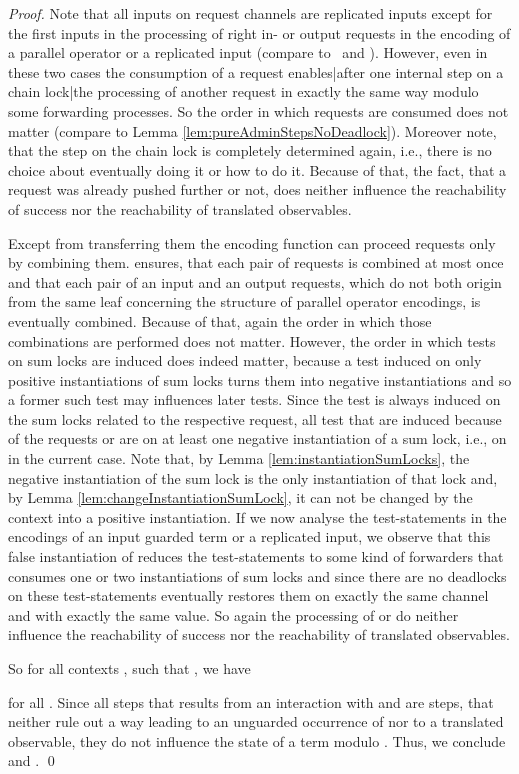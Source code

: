 \documentclass[]{llncs}
\begin{document}
\begin{proof}
	Note that all inputs on request channels are replicated inputs except for the first inputs in the processing of right in- or output requests in the encoding of a parallel operator or a replicated input (compare to \processRightOutputRequests \ and \processRightInputRequests). However, even in these two cases the consumption of a request enables|after one internal step on a chain lock|the processing of another request in exactly the same way modulo some forwarding processes. So the order in which requests are consumed does not matter (compare to Lemma \ref{lem:pureAdminStepsNoDeadlock}). Moreover note, that the step on the chain lock is completely determined again, i.e., there is no choice about eventually doing it or how to do it. Because of that, the fact, that a request was already pushed further or not, does neither influence the reachability of success nor the reachability of translated observables.
	
	Except from transferring them the encoding function can proceed requests only by combining them.  ensures, that each pair of requests is combined at most once and that each pair of an input and an output requests, which do not both origin from the same leaf concerning the structure of parallel operator encodings, is eventually combined. Because of that, again the order in which those combinations are performed does not matter. However, the order in which tests on sum locks are induced does indeed matter, because a test induced on only positive instantiations of sum locks turns them into negative instantiations and so a former such test may influences later tests. Since the test is always induced on the sum locks related to the respective request, all test that are induced because of the requests  or  are on at least one negative instantiation of a sum lock, i.e., on  in the current case. Note that, by Lemma \ref{lem:instantiationSumLocks}, the negative instantiation of the sum lock  is the only instantiation of that lock and, by Lemma \ref{lem:changeInstantiationSumLock}, it can not be changed by the context into a positive instantiation. If we now analyse the test-statements in the encodings of an input guarded term or a replicated input, we observe that this false instantiation of  reduces the test-statements to some kind of forwarders that consumes one or two instantiations of sum locks and since there are no deadlocks on these test-statements eventually restores them on exactly the same channel and with exactly the same value. So again the processing of  or  do neither influence the reachability of success nor the reachability of translated observables.
	
	So for all contexts , such that , we have
	
	for all . Since all steps that results from an interaction with  and  are \admin steps, that neither rule out a way leading to an unguarded occurrence of  nor to a translated observable, they do not influence the state of a term modulo . Thus, we conclude  and .
	\qed
\end{proof}
\end{document}
